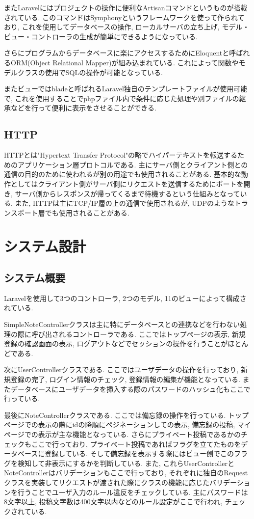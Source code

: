 \documentclass[submit,techrep]{ipsj}
\begin{document}
またLaravelにはプロジェクトの操作に便利なArtisanコマンドというものが搭載されている. このコマンドはSymphonyというフレームワークを使って作られており, これを使用してデータベースの操作, ローカルサーバの立ち上げ, モデル・ビュー・コントローラの生成が簡単にできるようになっている. 

さらにプログラムからデータベースに楽にアクセスするためにEloquentと呼ばれるORM(Object Relational Mapper)が組み込まれている. これによって関数やモデルクラスの使用でSQLの操作が可能となっている.

またビューではbladeと呼ばれるLaravel独自のテンプレートファイルが使用可能で, これを使用することでphpファイル内で条件に応じた処理や別ファイルの継承などを行って便利に表示をさせることができる. 

\subsection{HTTP}
HTTPとは"Hypertext Transfer Protocol"の略でハイパーテキストを転送するためのアプリケーション層プロトコルである. 
主にサーバ側とクライアント側との通信の目的のために使われるが別の用途でも使用されることがある. 基本的な動作としてはクライアント側がサーバ側にリクエストを送信するためにポートを開き, サーバ側からレスポンスが帰ってくるまで待機するという仕組みとなっている. 
また, HTTPは主にTCP/IP層の上の通信で使用されるが, UDPのようなトランスポート層でも使用されることがある. 

\section{システム設計}
\subsection{システム概要}
Laravelを使用して3つのコントローラ, 2つのモデル, 11のビューによって構成されている. 

SimpleNoteControllerクラスは主に特にデータベースとの連携などを行わない処理の際に呼び出されるコントローラである. 
ここではトップページの表示, 新規登録の確認画面の表示, ログアウトなどでセッションの操作を行うことがほとんどである. 

次にUserControllerクラスである. ここではユーザデータの操作を行っており, 新規登録の完了, ログイン情報のチェック, 登録情報の編集が機能となっている. またデータベースにユーザデータを挿入する際のパスワードのハッシュ化もここで行っている. 

最後にNoteControllerクラスである. ここでは備忘録の操作を行っている. トップページでの表示の際にidの降順にペジネーションしての表示, 備忘録の投稿, マイページでの表示が主な機能となっている. さらにプライベート投稿であるかのチェックもここで行っており, プライベート投稿であればフラグを立てたものをデータベースに登録している. 
そして備忘録を表示する際にはビュー側でこのフラグを検知して非表示にするかを判断している. 
また, これらUserControllerとNoteControllerはバリデーションもここで行っており, それぞれに独自のRequestクラスを実装してリクエストが渡された際にクラスの機能に応じたバリデーションを行うことでユーザ入力のルール違反をチェックしている. 主にパスワードは8文字以上, 投稿文字数は400文字以内などのルール設定がここで行われ, チェックされている.
\end{document}
